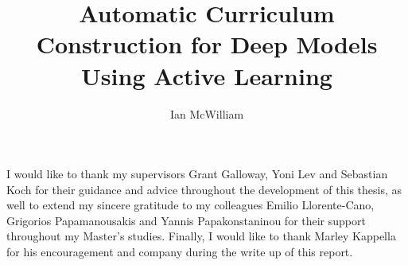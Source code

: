 \documentclass[msc,ai,leftchapter,deptreport]{infthesis}  %
\title{Automatic Curriculum Construction for Deep Models Using Active Learning}
\author{Ian McWilliam}
\begin{document}
\begin{preliminary}

\maketitle

\begin{acknowledgements}
I would like to thank my supervisors Grant Galloway, Yoni Lev and Sebastian Koch for their guidance and advice throughout the development of this thesis, as well to extend my sincere gratitude to my colleagues Emilio Llorente-Cano, Grigorios Papamanousakis and Yannis Papakonstaninou for their support throughout my Master's studies. Finally, I would like to thank Marley Kappella for his encouragement and company during the write up of this report.
\end{acknowledgements}

\standarddeclaration

\tableofcontents


\end{preliminary}
















% 
%



\singlespace







\end{document}
